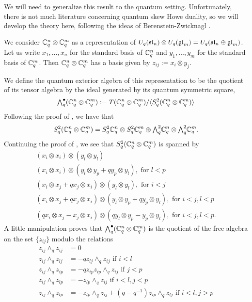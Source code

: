 \documentclass[11pt]{amsart}
\begin{document}
We will need to generalize this result to the quantum setting.  Unfortunately, there is not much literature concerning quantum skew Howe duality, so we will develop the theory here, following the ideas of Berenstein-Zwicknagl \cite{BZ}.  

We consider $ {\mathbb{C}}^n_q \otimes {\mathbb{C}}^m_q $ as a representation of $U_q({\mathfrak{sl}}_n) \otimes U_q({\mathfrak{gl}}_m) = U_q({\mathfrak{sl}}_n \oplus {\mathfrak{gl}}_m) $. Let us write $ x_1, \dots, x_n $ for the standard basis of $ {\mathbb{C}}_q^n $ and $ y_1, \dots, y_m $ for the standard basis of $ {\mathbb{C}}_q^m $.  Then $ {\mathbb{C}}_q^n \otimes {\mathbb{C}}_q^m $ has a basis given by $ z_{ij} := x_i \otimes y_j $.

We define the quantum exterior algebra of this representation to be the quotient of its tensor algebra by the ideal generated by its quantum symmetric square,
$${\textstyle\bigwedge^{\bullet}_{q}}({\mathbb{C}}_q^n \otimes {\mathbb{C}}_q^m) := T ({\mathbb{C}}_q^n \otimes {\mathbb{C}}_q^m) / \langle S^2_q ({\mathbb{C}}_q^n \otimes {\mathbb{C}}_q^m) \rangle$$
Following the proof of \cite[Prop. 2.38]{BZ}, we have that 
$$ S^2_q ({\mathbb{C}}_q^n \otimes {\mathbb{C}}_q^m) = S^2_q {\mathbb{C}}_q^n \otimes S^2_q {\mathbb{C}}_q^m \oplus {\textstyle\bigwedge^{2}_{q}} {\mathbb{C}}_q^n \otimes {\textstyle\bigwedge^{2}_{q}} {\mathbb{C}}_q^m. $$
Continuing the proof of \cite[Prop. 2.38]{BZ}, we see that $ S^2_q ({\mathbb{C}}_q^n \otimes {\mathbb{C}}_q^m) $ is spanned by
\begin{gather*}
(x_i \otimes x_i) \otimes (y_l \otimes y_l) \\
(x_i \otimes x_i) \otimes (y_l \otimes y_p + q y_p \otimes y_l), \text{ for } l < p \\
(x_i \otimes x_j + q x_j \otimes x_i) \otimes (y_l \otimes y_l), \text{ for } i < j \\
(x_i \otimes x_j + q x_j \otimes x_i) \otimes (y_l \otimes y_p + q y_p \otimes y_l), \text{ for } i < j, l < p \\
(q x_i \otimes x_j -  x_j \otimes x_i) \otimes (q y_l \otimes y_p -  y_p \otimes y_l), \text{ for } i < j, l < p.
\end{gather*}
A little manipulation proves that $ {\textstyle\bigwedge^{\bullet}_{q}}({\mathbb{C}}_q^n \otimes {\mathbb{C}}_q^m) $ is the quotient of the free algebra on the set $ \{ z_{ij} \} $ modulo the relations
\begin{align*}
z_{ij} \wedge_q z_{ij} &= 0 \\
z_{ij} \wedge_q z_{lj} &= - q z_{lj} \wedge_q z_{ij}  \text{ if } i < l \\
z_{ij} \wedge_q z_{ip} &= - q z_{ip} z_{ip} \wedge_q z_{ij} \text{ if } j < p \\
z_{ij} \wedge_q z_{lp} &= - z_{lp} \wedge_q z_{ij} \text{ if  } i < l, j < p \\
z_{ij} \wedge_q z_{lp} &= - z_{lp} \wedge_q z_{ij} + (q - q^{-1}) z_{ip} \wedge_q z_{lj} \text{ if } i < l, j > p 
\end{align*}
\end{document}
